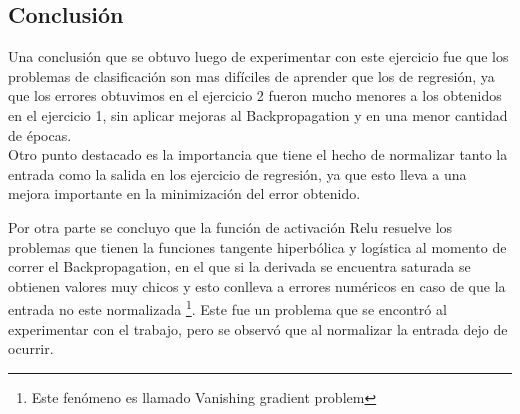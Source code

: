 \subsection{Conclusión}
Una conclusión que se obtuvo luego de experimentar con este ejercicio fue que los problemas de clasificación son mas difíciles de aprender que los de regresión, ya que
los errores obtuvimos en el ejercicio 2 fueron mucho menores a los obtenidos en el ejercicio 1, sin aplicar mejoras al Backpropagation y en una menor cantidad de épocas. \\
Otro punto destacado es la importancia que tiene el hecho de normalizar tanto la entrada como la salida en los ejercicio de regresión, ya que esto lleva a una mejora importante
en la minimización del error obtenido.

Por otra parte se concluyo que la función de activación Relu resuelve los problemas que tienen la funciones tangente hiperbólica y logística al momento de correr el Backpropagation,
en el que si la derivada se encuentra saturada se obtienen valores muy chicos y esto conlleva a errores numéricos en caso de que la entrada no este normalizada \footnote{Este fenómeno es llamado Vanishing gradient problem}. Este fue un problema
que se encontró al experimentar con el trabajo, pero se observó que al normalizar la entrada dejo de ocurrir. 
